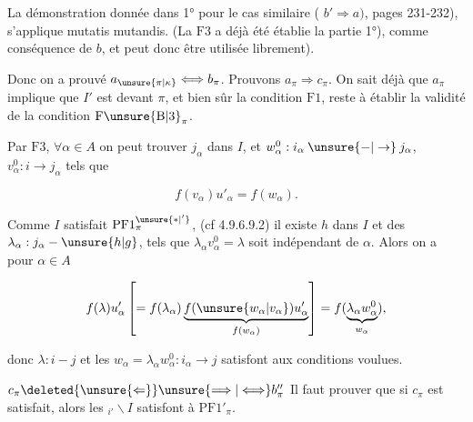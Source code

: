 
La démonstration donnée dans 1° pour le cas similaire  (  $b'\Longrightarrow a)$, pages 231-232), s'applique mutatis mutandis. (La   $\mathrm{F}3$  a déjà été établie  la partie 1°), comme conséquence de $b$, et peut donc être utilisée librement).

Donc on a prouvé $a_{\unsure{\pi|\kappa}}\Longleftrightarrow b_\pi$. Prouvons $a_\pi\Longrightarrow c_\pi$. On sait déjà que $a_\pi$ implique que $I'$ est  devant $\pi$, et bien sûr la condition $\mathrm{F}1$, reste à établir la validité de la condition $\mathrm{F\unsure{B|3}}_\pi$.


Par $\mathrm{F}3$, $\forall\alpha\in A$ on peut trouver $j_\alpha$ dans $I$, et $w_\alpha^0:i_\alpha\mathbin{\unsure{-|\to}}j_\alpha$, $v_\alpha^0:i\to j_\alpha$ tels que

\[
f(v_\alpha)u'_\alpha=f(w_\alpha).
\]

Comme $I$ satisfait $\mathrm{PF}1^{\unsure{*|'}}_\pi$,  (cf 4.9.6.9.2) il existe  $h$ dans $I$ et des $\lambda_\alpha:j_\alpha\mathbin{-}\unsure{h|g}$, tels que $\lambda_\alpha v_\alpha^0=\lambda$ soit indépendant de $\alpha$. Alors  on a pour  $\alpha\in A$

\[
f(\lambda)u'_\alpha\left[=f(\lambda_\alpha)\underbrace{f(\unsure{w_\alpha|v_\alpha})u'_\alpha}_{f(w_\alpha)}\right]
=f(\underbrace{\lambda_\alpha w_\alpha^0}_{w_\alpha}),
\]

donc  $\lambda:i\mathbin{-}j$ et les  $w_\alpha=\lambda_\alpha w_\alpha^0:i_\alpha\longrightarrow j$ satisfont aux conditions voulues.

$c_\pi\deleted{\unsure{\Leftarrow}}\unsure{\Longrightarrow|\Longleftrightarrow}b_\pi''$ Il faut prouver que si $c_\pi$ est satisfait, alors les $ {}_{i'}\backslash I$ satisfont à $\mathrm{PF}1'_\pi$.

